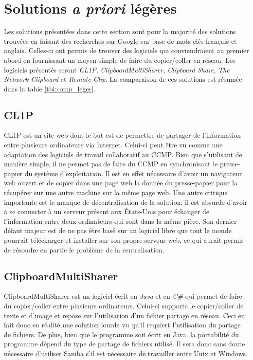 \section{Solutions \emph{a priori} légères}
Les solutions présentées dans cette section sont pour la majorité des
solutions trouvées en faisant des recherches sur Google sur base
de mots clés français et anglais. Celles-ci ont permis de trouver des
logiciels qui conviendraient au premier abord en fournissant un moyen
simple de faire du copier/coller en réseau. Les logiciels présentés seront
\emph{CL1P}, \emph{ClipboardMultiSharer}, \emph{Clipboard Share},
\emph{The Network Clipboard} et \emph{Remote Clip}.
La comparaison de ces solutions est résumée dans la table \ref{tbl:comp_leger}.

\subsection{CL1P}
CL1P\cite{cl1p} est un site web dont le but est de permettre de partager
de l'information entre plusieurs ordinateurs via Internet. Celui-ci
peut être vu comme une adaptation des logiciels de travail collaboratif au
CCMP. Bien que s'utilisant de manière simple, il ne permet pas de faire du
CCMP en synchronisant le presse-papier du système d'exploitation. Il est en
effet nécessaire d'avoir un navigateur web ouvert et de copier dans une page
web la donnée du presse-papier pour la récupérer sur une autre machine
sur la même page web. Une autre critique importante est le manque de
décentralisation de la solution: il est absurde d'avoir à se connecter à un
serveur présent aux États-Unis pour échanger de l'information entre deux
ordinateurs qui sont dans la même pièce. Son dernier défaut majeur est de
ne pas être basé sur un logiciel libre que tout le monde pourrait télécharger
et installer sur son propre serveur web, ce qui aurait permis de résoudre
en partie le problème de la centralisation.

\subsection{ClipboardMultiSharer}
ClipboardMultiSharer \cite{clipmsharer} est un logiciel écrit en \emph{Java}
et en \emph{C\#} qui permet de faire du copier/coller entre plusieurs
ordinateurs. Celui-ci supporte le copier/coller de texte et d'image et repose
sur l'utilisation d'un fichier partagé en réseau. Ceci en fait donc en réalité
une solution lourde vu qu'il requiert l'utilisation du partage de fichiers.
De plus, bien que le programme soit écrit en Java, la portabilité du programme
dépend du type de partage de fichiers utilisé. Il sera donc sans doute
nécessaire d'utiliser Samba s'il est nécessaire de travailler entre Unix
et Windows.

